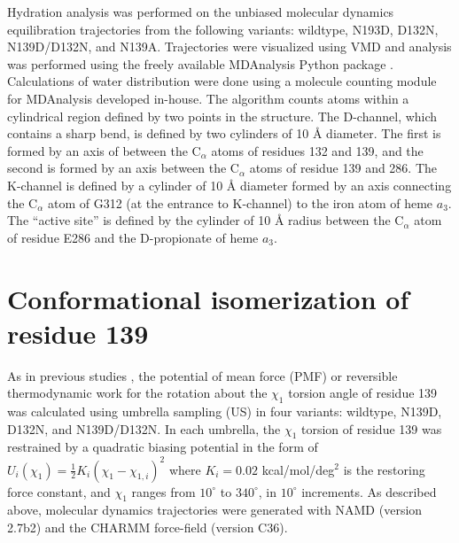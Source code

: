 Hydration analysis was performed on the unbiased molecular dynamics equilibration trajectories from the following variants: wildtype, N193D, D132N, N139D/D132N, and N139A. Trajectories were visualized using VMD \cite{Humphrey:1996p5456} and analysis was performed using the freely available MDAnalysis Python package \cite{MichaudAgrawal:2011p10254}. Calculations of water distribution were done using a molecule counting module for MDAnalysis developed in-house. The algorithm counts atoms within a cylindrical region defined by two points in the structure. The D-channel, which contains a sharp bend, is defined by two cylinders of 10 Å diameter. The first is formed by an axis of between the C$_{\alpha}$ atoms of residues 132 and 139, and the second is formed by an axis between the C$_{\alpha}$ atoms of residue 139 and 286. The K-channel is defined by a cylinder of 10 Å diameter formed by an axis connecting the C$_{\alpha}$ atom of G312 (at the entrance to K-channel) to the iron atom of heme $a_3$. The ``active site'' is defined by the cylinder of 10 Å radius between the C$_{\alpha}$ atom of residue E286 and the D-propionate of heme $a_3$.

\section{Conformational isomerization of residue 139}
\label{sec:methods-isomerization}

As in previous studies \cite{Henry:2009p4543,Henry:2011p10221}, the potential of mean force (PMF) or reversible thermodynamic work for the rotation about the $\chi_1$ torsion angle of residue 139 was calculated using umbrella sampling (US) in four variants: wildtype, N139D, D132N, and N139D/D132N. In each umbrella, the $\chi_{1}$ torsion of residue 139 was restrained by a quadratic biasing potential in the form of $U_{i}(\chi_1) = \frac{1}{2}K_{i}(\chi_{1}-\chi_{1,i})^2$ where $K_i = 0.02$ kcal/mol/deg$^2$ is the restoring force constant, and $\chi_1$ ranges from $10^\circ$ to $340^\circ$, in $10^\circ$ increments. As described above, molecular dynamics trajectories were generated with NAMD (version 2.7b2) \cite{Phillips:2005p10251} and the CHARMM force-field (version C36).

